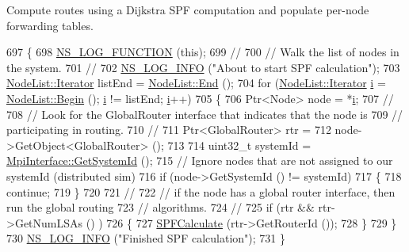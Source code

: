 Compute routes using a Dijkstra S\+PF computation and populate per-\/node forwarding tables. 


\begin{DoxyCode}
697 \{
698   \hyperlink{log-macros-disabled_8h_a90b90d5bad1f39cb1b64923ea94c0761}{NS\_LOG\_FUNCTION} (\textcolor{keyword}{this});
699 \textcolor{comment}{//}
700 \textcolor{comment}{// Walk the list of nodes in the system.}
701 \textcolor{comment}{//}
702   \hyperlink{group__logging_gafbd73ee2cf9f26b319f49086d8e860fb}{NS\_LOG\_INFO} (\textcolor{stringliteral}{"About to start SPF calculation"});
703   \hyperlink{classns3_1_1NodeList_a9e2679a94efb4f0066cc21e65440364d}{NodeList::Iterator} listEnd = \hyperlink{classns3_1_1NodeList_a027a558c16e6078e25c7ffc67becb559}{NodeList::End} ();
704   \textcolor{keywordflow}{for} (\hyperlink{classns3_1_1NodeList_a9e2679a94efb4f0066cc21e65440364d}{NodeList::Iterator} \hyperlink{bernuolliDistribution_8m_a6f6ccfcf58b31cb6412107d9d5281426}{i} = \hyperlink{classns3_1_1NodeList_a93d2211831f5cb71d1dbb721e2721d7f}{NodeList::Begin} (); 
      \hyperlink{bernuolliDistribution_8m_a6f6ccfcf58b31cb6412107d9d5281426}{i} != listEnd; \hyperlink{bernuolliDistribution_8m_a6f6ccfcf58b31cb6412107d9d5281426}{i}++)
705     \{
706       Ptr<Node> node = *\hyperlink{bernuolliDistribution_8m_a6f6ccfcf58b31cb6412107d9d5281426}{i};
707 \textcolor{comment}{//}
708 \textcolor{comment}{// Look for the GlobalRouter interface that indicates that the node is}
709 \textcolor{comment}{// participating in routing.}
710 \textcolor{comment}{//}
711       Ptr<GlobalRouter> rtr = 
712         node->GetObject<GlobalRouter> ();
713 
714       uint32\_t systemId = \hyperlink{classns3_1_1MpiInterface_a7f1f671b55948fb1c8f7eb54f22a9619}{MpiInterface::GetSystemId} ();
715       \textcolor{comment}{// Ignore nodes that are not assigned to our systemId (distributed sim)}
716       \textcolor{keywordflow}{if} (node->GetSystemId () != systemId) 
717         \{
718           \textcolor{keywordflow}{continue};
719         \}
720 
721 \textcolor{comment}{//}
722 \textcolor{comment}{// if the node has a global router interface, then run the global routing}
723 \textcolor{comment}{// algorithms.}
724 \textcolor{comment}{//}
725       \textcolor{keywordflow}{if} (rtr && rtr->GetNumLSAs () )
726         \{
727           \hyperlink{classns3_1_1GlobalRouteManagerImpl_a03cdea3013a73c90ae8d67946b237c45}{SPFCalculate} (rtr->GetRouterId ());
728         \}
729     \}
730   \hyperlink{group__logging_gafbd73ee2cf9f26b319f49086d8e860fb}{NS\_LOG\_INFO} (\textcolor{stringliteral}{"Finished SPF calculation"});
731 \}
\end{DoxyCode}


